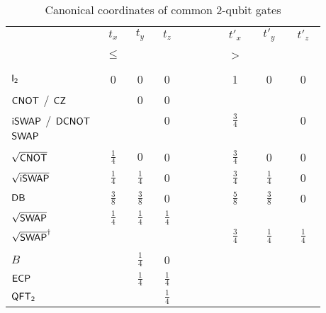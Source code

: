 \documentclass[article,pagebackref]{bespoke5}
\newcommand{\Gate}[1]{\ensuremath{{\sf{#1}}}}
\begin{document}
\def\arraystretch{1.5}
\begin{table}[tp]
\caption{Canonical coordinates of common 2-qubit gates}
\label{weyl_table}
\begin{threeparttable}
\centering
\begin{tabular}{lccccccc}
		\text{Gate}		& $t_x$ 	& $t_y$	& $t_z$ & & $t'_x$ 	& $t'_y$	& $t'_z$	\\
				& $\leq$\half & & &  &>\half & & \\ 
				& $\qquad$& & $\qquad$& $\qquad$& $\qquad$&  $\qquad$& $\qquad$\\
$\Gate{I_2}$						& 0		& 0		& 0	& & 1 &0&0	\\
$\Gate{CNOT}$  / $\Gate{CZ}$ 	&\half	& 0		& 0		\\
$\Gate{iSWAP}$ / $\Gate{DCNOT}$ &\half	& \half		& 0		& & $\tfrac{3}{4}$ & \half & 0	\\
$\Gate{SWAP}$  					&\half	& \half		& \half		\\
\\
$\sqrt{\Gate{CNOT}}$  			&$\tfrac{1}{4}$	& $0$		& 0		& & $\tfrac{3}{4}$ & 0 & 0	\\
$\sqrt{\Gate{iSWAP}}$  			&$\tfrac{1}{4}$	& $\tfrac{1}{4}$		& 0		& & $\tfrac{3}{4}$ & $\tfrac{1}{4}$ & 0	\\
${\Gate{DB}}$  					&$\tfrac{3}{8}$	& $\tfrac{3}{8}$		& 0		& & $\tfrac{5}{8}$ & $\tfrac{3}{8}$ & 0	\\
$\sqrt{\Gate{SWAP}}$  			&$\tfrac{1}{4}$	& $\tfrac{1}{4}$		& $\tfrac{1}{4}$		\\
$\sqrt{\Gate{SWAP}}^\dagger$  	& & & & &$\tfrac{3}{4}$	& $\tfrac{1}{4}$		&$\tfrac{1}{4}$	\\
\\
$B$  							&\half	& $\tfrac{1}{4}$		& 0		\\
$\Gate{ECP}$  					&\half	& $\tfrac{1}{4}$		&  $\tfrac{1}{4}$	\\
$\Gate{QFT_2}$  					&\half	& \half		&  $\tfrac{1}{4}$	\\
\end{tabular}
\end{threeparttable}
\label{default}
\end{table}%
\end{document}
